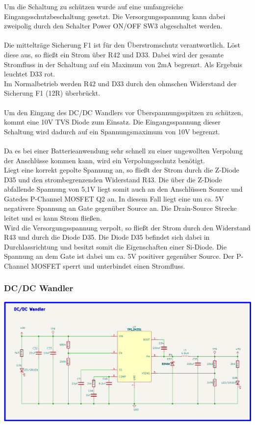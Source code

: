 Um die Schaltung zu schützen wurde auf eine umfangreiche Eingangsschutzbeschaltung gesetzt. Die Versorgungsspannung kann dabei zweipolig durch den Schalter \glqq Power ON/OFF SW3 \grqq{} abgeschaltet werden.
\\
\\
Die mittelträge Sicherung F1 ist für den Überstromschutz verantwortlich. Löst diese aus, so fließt ein Strom über R42 und D33. Dabei wird der gesamte Stromfluss in der Schaltung auf ein Maximum von 2mA begrenzt. Als Ergebnis leuchtet D33 rot.
\\
Im Normalbetrieb werden R42 und D33 durch den ohmschen Widerstand der Sicherung F1 (12R) überbrückt.
\\
\\
Um den Eingang des DC/DC Wandlers vor Überspannungsspitzen zu schützen, kommt eine 10V TVS Diode zum Einsatz. Die Eingangsspannung dieser Schaltung wird dadurch auf ein Spannungsmaximum von 10V begrenzt. 
\\
\\
Da es bei einer Batterieanwendung sehr schnell zu einer ungewollten Verpolung der Anschlüsse kommen kann, wird ein Verpolungsschutz benötigt.
\\
Liegt eine korrekt gepolte Spannung an, so fließt der Strom durch die Z-Diode D35 und den strombegrenzenden Widerstand R43. Die über die Z-Diode abfallende Spannung von 5,1V liegt somit auch an den Anschlüssen \glqq Source\grqq{} und \glqq Gate\grqq des P-Channel MOSFET Q2 an.
In diesem Fall liegt eine um ca. 5V negativere Spannung an Gate gegenüber Source an. Die Drain-Source Strecke leitet und es kann Strom fließen.
\\ 
Wird die Versorgungsspannung verpolt, so fließt der Strom durch den Widerstand R43 und durch die Diode D35. Die Diode D35 befindet sich dabei in Durchlassrichtung und besitzt somit die Eigenschaften einer Si-Diode.
Die Spannung an dem Gate ist dabei um ca. 5V positiver gegenüber Source. Der P-Channel MOSFET sperrt und unterbindet einen Stromfluss.
\\

\subsubsection{DC/DC Wandler}

\begin{center}
\includegraphics[width=16cm]{Bilder/DCDCWandler.png}
\end{center}

